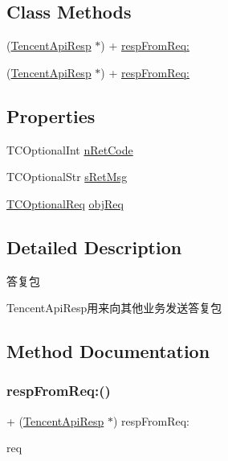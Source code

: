 \subsection*{Class Methods}
\begin{DoxyCompactItemize}
\item 
(\mbox{\hyperlink{interface_tencent_api_resp}{Tencent\+Api\+Resp}} $\ast$) + \mbox{\hyperlink{interface_tencent_api_resp_a2859c22affd763f1da5b5aaa3a442d7c}{resp\+From\+Req\+:}}
\item 
(\mbox{\hyperlink{interface_tencent_api_resp}{Tencent\+Api\+Resp}} $\ast$) + \mbox{\hyperlink{interface_tencent_api_resp_a2859c22affd763f1da5b5aaa3a442d7c}{resp\+From\+Req\+:}}
\end{DoxyCompactItemize}
\subsection*{Properties}
\begin{DoxyCompactItemize}
\item 
T\+C\+Optional\+Int \mbox{\hyperlink{interface_tencent_api_resp_acadc81491ece925fc38f2c9bfde626b1}{n\+Ret\+Code}}
\item 
T\+C\+Optional\+Str \mbox{\hyperlink{interface_tencent_api_resp_a114465068484407c6d1735a06aaf9091}{s\+Ret\+Msg}}
\item 
\mbox{\hyperlink{interface_tencent_api_req}{T\+C\+Optional\+Req}} \mbox{\hyperlink{interface_tencent_api_resp_af8228b8ebb3a1804ca137726ba774c27}{obj\+Req}}
\end{DoxyCompactItemize}


\subsection{Detailed Description}
答复包 

Tencent\+Api\+Resp用来向其他业务发送答复包 

\subsection{Method Documentation}
\mbox{\label{interface_tencent_api_resp_a2859c22affd763f1da5b5aaa3a442d7c}} 
\subsubsection{\texorpdfstring{resp\+From\+Req\+:()}{respFromReq:()}\hspace{0.1cm}{\footnotesize\ttfamily [1/2]}}
{\footnotesize\ttfamily + (\mbox{\hyperlink{interface_tencent_api_resp}{Tencent\+Api\+Resp}} $\ast$) resp\+From\+Req\+: \begin{DoxyParamCaption}\item[{(\mbox{\hyperlink{interface_tencent_api_req}{Tencent\+Api\+Req}} $\ast$)}]{req }\end{DoxyParamCaption}}

